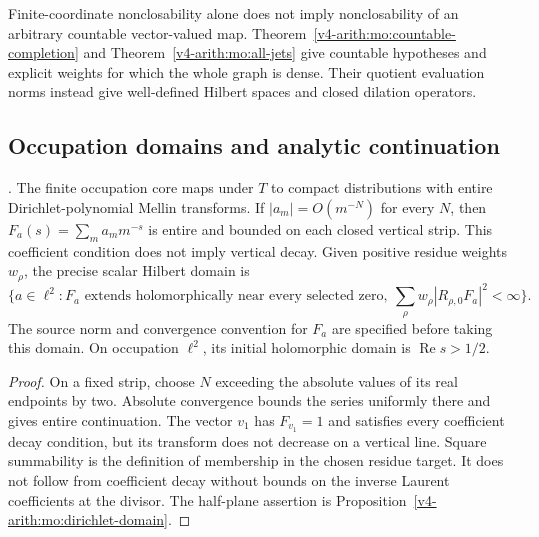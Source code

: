 \begin{remark}
\label{v4-arith:w9-r4:rem:unboundedness-intrinsic}
Finite-coordinate nonclosability alone does not imply
nonclosability of an arbitrary countable vector-valued map.
Theorem~\ref{v4-arith:mo:countable-completion} and Theorem~\ref{v4-arith:mo:all-jets}
give countable hypotheses and explicit weights for which the
whole graph is dense. Their quotient evaluation norms instead
give well-defined Hilbert spaces and closed dilation operators.
\end{remark}

\subsection{Occupation domains and analytic continuation}
\label{v4-arith:w9-r4:obstacle-kernel:domain}

\begin{proposition}
\label{v4-arith:w9-r4:prop:candidate-domains}
\ClaimStatusProvedHere. The finite occupation core maps under $T$
to compact distributions with entire Dirichlet-polynomial Mellin
transforms. If $|a_m|=O(m^{-N})$ for every $N$, then
$F_a(s)=\sum_m a_m m^{-s}$ is entire and bounded on each closed
vertical strip. This coefficient condition does not imply vertical
decay. Given positive residue weights $w_\rho$, the precise
scalar Hilbert domain is
\[
 \{a\in\ell^2:F_a\text{ extends holomorphically near every selected zero},
       \ \sum_\rho w_\rho|R_{\rho,0}F_a|^2<\infty\}.
\]
The source norm and convergence convention for $F_a$ are specified
before taking this domain. On occupation $\ell^2$, its initial
holomorphic domain is $\operatorname{Re}s>1/2$.
\end{proposition}
\begin{proof}
On a fixed strip, choose $N$ exceeding the absolute values of
its real endpoints by two. Absolute convergence bounds the series
uniformly there and gives entire continuation. The vector $v_1$
has $F_{v_1}=1$ and satisfies every coefficient decay condition,
but its transform does not decrease on a vertical line.
Square summability is the definition of membership in the chosen
residue target. It does not follow from coefficient decay without
bounds on the inverse Laurent coefficients at the divisor.
The half-plane assertion is Proposition~\ref{v4-arith:mo:dirichlet-domain}.
\end{proof}

